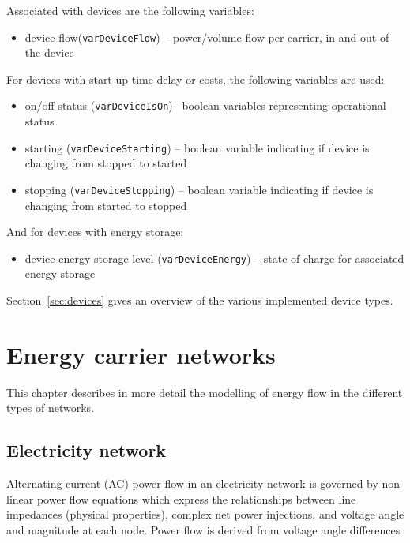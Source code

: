 \documentclass[12pt]{article}
\begin{document}
Associated with devices are the following variables:
\begin{itemize}
	\item device flow(\texttt{varDeviceFlow}) – power/volume flow per carrier, in and out of the device
\end{itemize}
%
For devices with start-up time delay or costs, the following variables are used:
\begin{itemize}
	\item on/off status (\texttt{varDeviceIsOn})– boolean variables representing operational status
	\item starting (\texttt{varDeviceStarting}) – boolean variable indicating if device is changing from stopped to started 
	\item stopping (\texttt{varDeviceStopping}) – boolean variable indicating if device is changing from started to stopped
\end{itemize}
%
And for devices with energy storage:
\begin{itemize}
	\item device energy storage level (\texttt{varDeviceEnergy}) – state of charge for associated energy storage
\end{itemize}


Section~\ref{sec:devices} gives an overview of the various implemented device types.





\section{Energy carrier networks}
\label{sec:networks}

This chapter describes in more detail the modelling of energy flow in the different types of networks.


\subsection{Electricity network}

Alternating current (AC) power flow in an electricity network is governed by non-linear power flow equations which express the relationships between line impedances (physical properties), complex net power injections, and voltage angle and magnitude at each node. Power flow is derived from voltage angle differences
\end{document}
